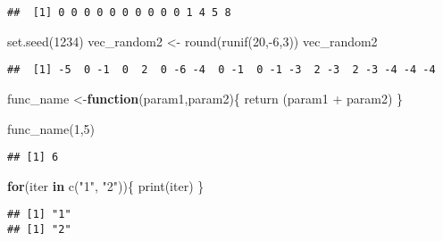 \documentclass[
]{article}
\newenvironment{Shaded}{\begin{snugshade}}{\end{snugshade}}
\newcommand{\ControlFlowTok}[1]{\textcolor[rgb]{0.13,0.29,0.53}{\textbf{#1}}}
\newcommand{\DecValTok}[1]{\textcolor[rgb]{0.00,0.00,0.81}{#1}}
\newcommand{\FunctionTok}[1]{\textcolor[rgb]{0.00,0.00,0.00}{#1}}
\newcommand{\NormalTok}[1]{#1}
\newcommand{\OtherTok}[1]{\textcolor[rgb]{0.56,0.35,0.01}{#1}}
\newcommand{\SpecialCharTok}[1]{\textcolor[rgb]{0.00,0.00,0.00}{#1}}
\newcommand{\StringTok}[1]{\textcolor[rgb]{0.31,0.60,0.02}{#1}}
\begin{document}
\begin{verbatim}
##  [1] 0 0 0 0 0 0 0 0 0 0 1 4 5 8
\end{verbatim}

\begin{Shaded}
\begin{Highlighting}[]
\FunctionTok{set.seed}\NormalTok{(}\DecValTok{1234}\NormalTok{)}
\NormalTok{vec\_random2 }\OtherTok{\textless{}{-}} \FunctionTok{round}\NormalTok{(}\FunctionTok{runif}\NormalTok{(}\DecValTok{20}\NormalTok{,}\SpecialCharTok{{-}}\DecValTok{6}\NormalTok{,}\DecValTok{3}\NormalTok{))}
\NormalTok{vec\_random2}
\end{Highlighting}
\end{Shaded}

\begin{verbatim}
##  [1] -5  0 -1  0  2  0 -6 -4  0 -1  0 -1 -3  2 -3  2 -3 -4 -4 -4
\end{verbatim}

\begin{Shaded}
\begin{Highlighting}[]
\NormalTok{func\_name }\OtherTok{\textless{}{-}}\ControlFlowTok{function}\NormalTok{(param1,param2)\{}
  \FunctionTok{return}\NormalTok{ (param1 }\SpecialCharTok{+}\NormalTok{ param2)}
\NormalTok{\}}

\FunctionTok{func\_name}\NormalTok{(}\DecValTok{1}\NormalTok{,}\DecValTok{5}\NormalTok{)}
\end{Highlighting}
\end{Shaded}

\begin{verbatim}
## [1] 6
\end{verbatim}

\begin{Shaded}
\begin{Highlighting}[]
\ControlFlowTok{for}\NormalTok{(iter }\ControlFlowTok{in} \FunctionTok{c}\NormalTok{(}\StringTok{"1"}\NormalTok{, }\StringTok{"2"}\NormalTok{))\{}
  \FunctionTok{print}\NormalTok{(iter)}
\NormalTok{\}}
\end{Highlighting}
\end{Shaded}

\begin{verbatim}
## [1] "1"
## [1] "2"
\end{verbatim}
\end{document}
